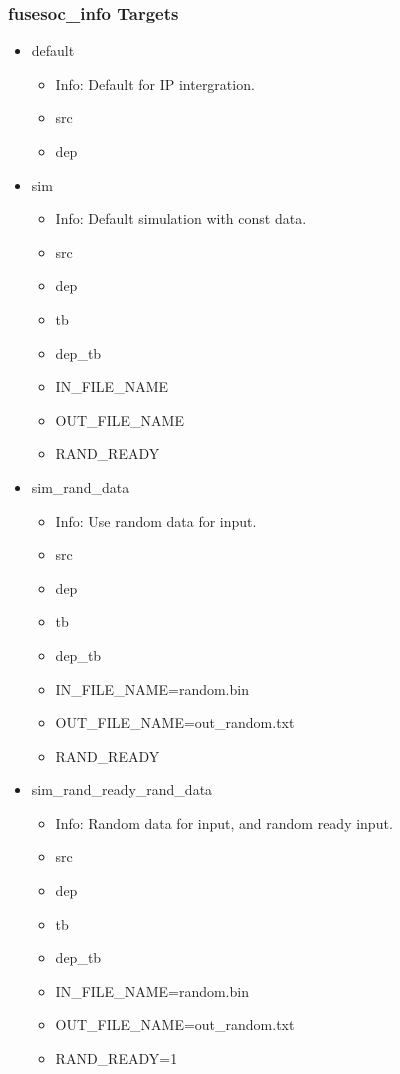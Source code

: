 \subsubsection{fusesoc\_info Targets}
\begin{itemize}
\item default
	\begin{itemize}
	\item[$\space$] Info: Default for IP intergration.
	\item src
	\item dep
	\end{itemize}
\item sim
	\begin{itemize}
	\item[$\space$] Info: Default simulation with const data.
	\item src
	\item dep
	\item tb
	\item dep\_tb
	\item IN\_FILE\_NAME
	\item OUT\_FILE\_NAME
	\item RAND\_READY
	\end{itemize}
\item sim\_rand\_data
	\begin{itemize}
	\item[$\space$] Info: Use random data for input.
	\item src
	\item dep
	\item tb
	\item dep\_tb
	\item IN\_FILE\_NAME=random.bin
	\item OUT\_FILE\_NAME=out\_random.txt
	\item RAND\_READY
	\end{itemize}
\item sim\_rand\_ready\_rand\_data
	\begin{itemize}
	\item[$\space$] Info: Random data for input, and random ready input.
	\item src
	\item dep
	\item tb
	\item dep\_tb
	\item IN\_FILE\_NAME=random.bin
	\item OUT\_FILE\_NAME=out\_random.txt
	\item RAND\_READY=1

\end{itemize}
\end{itemize}
